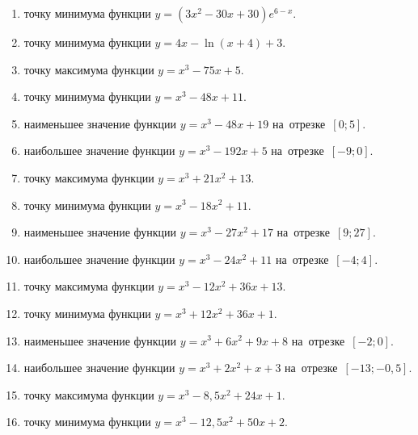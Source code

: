 \documentclass[a4paper,10pt]{article}
\begin{document}
\begin{enumerate}
\item {} точку минимума функции $y=\left(3x^2-30x+30\right){{e}^{6-x}}$.

\item {} точку минимума функции $y=4x-\ln \left(x+4\right)+3$.

\item {} точку максимума функции $y=x^3 -75x +5$.

\item {} точку минимума функции $y=x^3 -48x+11$.

\item {} наименьшее значение функции $y=x^3 -48x+19$ на~отрезке~$\left[0;5\right]$.

\item {} наибольшее значение функции $y=x^3 -192x+5$ на~отрезке~$\left[-9;0\right]$.

\item {} точку максимума функции $y=x^3 +21x^2+13$.

\item {} точку минимума функции $y=x^3 -18x^2+11$.

\item {} наименьшее значение функции $y=x^3 -27x^2+17$ на~отрезке~$\left[9;27\right]$.

\item {} наибольшее значение функции $y=x^3 -24x^2+11$ на~отрезке~$\left[-4;4\right]$.

\item {} точку максимума функции $y=x^3 -12x^2+36x+13$.

\item {} точку минимума функции $y=x^3 +12x^2+36x+1$.

\item {} наименьшее значение функции $y=x^3 +6x^2+9x+8$ на~отрезке~$\left[-2;0\right]$.

\item {} наибольшее значение функции $y=x^3 +2x^2+x+3$ на~отрезке~$\left[-13;-0,5\right]$.

\item {} точку максимума функции $y=x^3 -8,5x^2+24x+1$.

\item {} точку минимума функции $y=x^3 -12,5x^2+50x+2$.


\end{enumerate}
\end{document}
